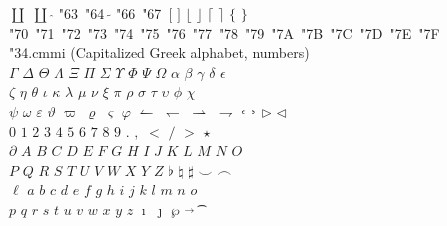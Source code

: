 \documentclass{article}
\begin{document}
$\coprod$ $\displaystyle\coprod$ $\widehat{}$ \selectfont\char"63\ \selectfont\char"64\ $\widetilde{}$ \selectfont\char"66\ \selectfont\char"67\ $\Big[$ $\Big]$ $\Big\lfloor$ $\Big\rfloor$ $\Big\lceil$ $\Big\rceil$ $\Big\{$ $\Big\}$\\
\selectfont\char"70\ \selectfont\char"71\ \selectfont\char"72\ \selectfont\char"73\ \selectfont\char"74\ \selectfont\char"75\ \selectfont\char"76\ \selectfont\char"77\ \selectfont\char"78\ \selectfont\char"79\ \selectfont\char"7A\ \selectfont\char"7B\ \selectfont\char"7C\ \selectfont\char"7D\ \selectfont\char"7E\ \selectfont\char"7F\ \\
\selectfont\char"34.cmmi (Capitalized Greek alphabet, numbers)\\
\noindent $\Gamma$ $\Delta$ $\Theta$ $\Lambda$ $\Xi$ $\Pi$ $\Sigma$ $\Upsilon$ $\Phi$ $\Psi$ $\Omega$ $\alpha$ $\beta$ $\gamma$ $\delta$ $\epsilon$\\ 
$\zeta$ $\eta$ $\theta$ $\iota$ $\kappa$ $\lambda$ $\mu$ $\nu$ $\xi$ $\pi$ $\rho$ $\sigma$ $\tau$ $\upsilon$ $\phi$ $\chi$\\
$\psi$ $\omega$ $\varepsilon$ $\vartheta$ $\varpi$ $\varrho$ $\varsigma$ $\varphi$ $\leftharpoonup$ $\leftharpoondown$ $\rightharpoonup$ $\rightharpoondown$ $\lhook$ $\rhook$ $\triangleright$ $\triangleleft$\\
$0$ $1$ $2$ $3$ $4$ $5$ $6$ $7$ $8$ $9$ $.$ $,$ $<$ $/$ $>$ $\star$\\
$\partial$ $A$ $B$ $C$ $D$ $E$ $F$ $G$ $H$ $I$ $J$ $K$ $L$ $M$ $N$ $O$\\
$P$ $Q$ $R$ $S$ $T$ $U$ $V$ $W$ $X$ $Y$ $Z$ $\flat$ $\natural$ $\sharp$ $\smile$ $\frown$\\
$\ell$ $a$ $b$ $c$ $d$ $e$ $f$ $g$ $h$ $i$ $j$ $k$ $l$ $m$ $n$ $o$\\
$p$ $q$ $r$ $s$ $t$ $u$ $v$ $w$ $x$ $y$ $z$ $\imath$ $\jmath$ $\wp$ $\vec{}$ \t{}%

\end{document}
